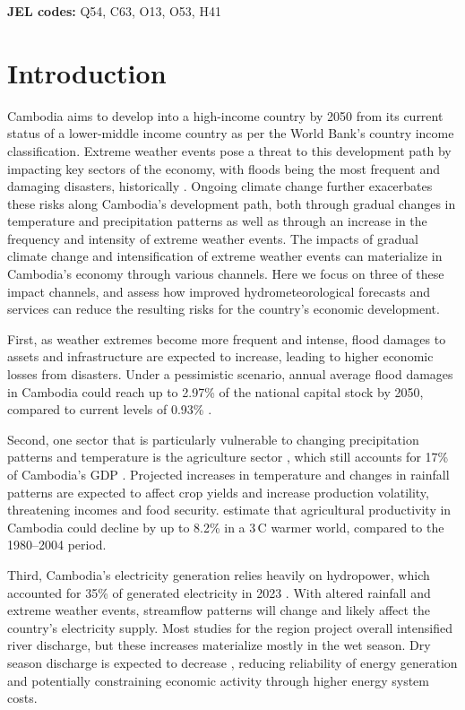 \documentclass[
  final,
  10pt,
  letterpaper,
  english,
]{article}
\begin{document}
\noindent
\textbf{JEL codes:} Q54, C63, O13, O53, H41

\restoregeometry
\clearpage


\section{Introduction}
Cambodia aims to develop into a high-income country by 2050 from its current
status of a lower-middle income country as per the World Bank's country income
classification. Extreme weather events pose a threat to this development path by
impacting key sectors of the economy, with floods being the most frequent and
damaging disasters, historically \parencite{undrr2019disaster_risk_cambodia}.
Ongoing climate change further exacerbates these risks along Cambodia's
development path, both through gradual changes in temperature and precipitation
patterns as well as through an increase in the frequency and intensity of
extreme weather events. The impacts of gradual climate change and
intensification of extreme weather events can materialize in Cambodia's economy
through various channels. Here we focus on three of these impact channels, and
assess how improved hydrometeorological forecasts and services can reduce the
resulting risks for the country's economic development.

First, as weather extremes become more frequent and intense, flood damages to
assets and infrastructure are expected to increase, leading to higher economic
losses from disasters. Under a pessimistic scenario, annual average flood
damages in Cambodia could reach up to 2.97\% of the national capital stock by
2050, compared to current levels of 0.93\% \parencite{worldbank2023ccdr}.

Second, one sector that is particularly vulnerable to changing precipitation
patterns and temperature is the agriculture sector
\parencite{wbadb2021climate_risk_cambodia}, which still accounts for 17\% of
Cambodia's GDP \parencite{wb2025agri_gdp_cambodia}. Projected increases in
temperature and changes in rainfall patterns are expected to affect crop yields
and increase production volatility, threatening incomes and food security.
\textcite{roson2016estimation} estimate that agricultural productivity in
Cambodia could decline by up to 8.2\% in a 3\degree\,C warmer world, compared to
the 1980--2004 period. 

Third, Cambodia's electricity generation relies heavily on hydropower, which
accounted for 35\% of generated electricity in 2023
\parencite{iea2023energy_mix_cambodia}. With altered rainfall and extreme
weather events, streamflow patterns will change and likely affect the country's
electricity supply. Most studies for the region project overall intensified
river discharge, but these increases materialize mostly in the wet season. Dry
season discharge is expected to decrease
\parencite{inseeyong2025evaluation,horton2022cambodian,li2021assessment},
reducing reliability of energy generation and potentially constraining economic
activity through higher energy system costs. 
\end{document}
